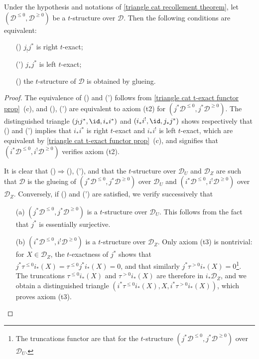 \begin{proposition}\label{triangle cat recollement t-structure iff}
Under the hypothesis and notations of \cref{triangle cat recollement theorem}, let $(\mathcal{D}^{\leq 0},\mathcal{D}^{\geq 0})$ be a $t$-structure over $\mathcal{D}$. Then the following conditions are equivalent:
\begin{enumerate}
    \item[(\rmnum{1})] $j_!j^*$ is right $t$-exact;
    \item[(\rmnum{1}')] $j_*j^*$ is left $t$-exact;
    \item[(\rmnum{2})] the $t$-structure of $\mathcal{D}$ is obtained by glueing.
\end{enumerate}
\end{proposition}
\begin{proof}
The equivalence of () and (') follows from \cref{triangle cat t-exact functor prop}~(c), and (), (') are equivalent to axiom (t2) for $(j^*\mathcal{D}^{\leq 0},j^*\mathcal{D}^{\geq 0})$. The distinguished triangle $(j_!j^*,\id,i_*i^*)$ and $(i_*i^!,\id,j_*j^*)$ shows respectively that () and (') implies that $i_*i^*$ is right $t$-exact and $i_*i^!$ is left $t$-exact, which are equivalent by \cref{triangle cat t-exact functor prop}~(c), and signifies that $(i^*\mathcal{D}^{\leq 0},i^!\mathcal{D}^{\geq 0})$ verifies axiom (t2).\par
It is clear that ()$\Rightarrow$(), ('), and that the $t$-structure over $\mathcal{D}_U$ and $\mathcal{D}_Z$ are such that $\mathcal{D}$ is the glueing of $(j^*\mathcal{D}^{\leq 0},j^*\mathcal{D}^{\geq 0})$ over $\mathcal{D}_U$ and $(i^*\mathcal{D}^{\leq 0},i^!\mathcal{D}^{\geq 0})$ over $\mathcal{D}_Z$. Conversely, if () and (') are satisfied, we verify successively that
\begin{enumerate}
    \item[(a)] $(j^*\mathcal{D}^{\leq 0},j^*\mathcal{D}^{\geq 0})$ is a $t$-structure over $\mathcal{D}_U$. This follows from the fact that $j^*$ is essentially surjective.
    \item[(b)] $(i^*\mathcal{D}^{\leq 0},i^!\mathcal{D}^{\geq 0})$ is a $t$-structure over $\mathcal{D}_Z$. Only axiom (t3) is nontrivial: for $X\in\mathcal{D}_Z$, the $t$-exactness of $j^*$ shows that $j^*\tau^{\leq 0}i_*(X)=\tau^{\leq 0}j^*i_*(X)=0$, and that similarly $j^*\tau^{>0}i_*(X)=0$\footnote{The truncations functor are that for the $t$-structure $(j^*\mathcal{D}^{\leq 0},j^*\mathcal{D}^{\geq 0})$ over $\mathcal{D}_U$.}. The truncations $\tau^{\leq 0}i_*(X)$ and $\tau^{>0}i_*(X)$ are therefore in $i_*\mathcal{D}_Z$, and we obtain a distinguished triangle $(i^*\tau^{\leq 0}i_*(X),X,i^*\tau^{>0}i_*(X))$, which proves axiom (t3).

\end{enumerate}
\end{proof}
